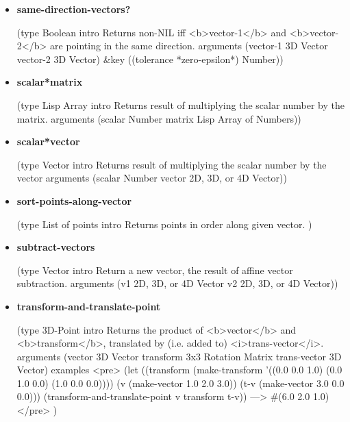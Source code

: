 \documentclass [11pt]{book}
\begin{document}
\begin{itemize}
\item {}
\label{prim:same-direction-vectors?}
\textbf{same-direction-vectors?}

(type Boolean intro
  Returns non-NIL iff <b>vector-1</b> and <b>vector-2</b> are pointing in the
same direction.
 arguments (vector-1 3D Vector vector-2 3D Vector) \&key
 ((tolerance *zero-epsilon*) Number))



\item {}
\label{prim:scalar*matrix}
\textbf{scalar*matrix}

(type Lisp Array intro
  Returns result of multiplying the scalar number by the matrix.
 arguments (scalar Number matrix Lisp Array of Numbers))



\item {}
\label{prim:scalar*vector}
\textbf{scalar*vector}

(type Vector intro
  Returns result of multiplying the scalar number by the vector
 arguments (scalar Number vector 2D, 3D, or 4D Vector))



\item {}
\label{prim:sort-points-along-vector}
\textbf{sort-points-along-vector}

(type List of points intro  Returns points in order along given vector.
)



\item {}
\label{prim:subtract-vectors}
\textbf{subtract-vectors}

(type Vector intro
  Return a new vector, the result of affine vector subtraction.
 arguments (v1 2D, 3D, or 4D Vector v2 2D, 3D, or 4D Vector))



\item {}
\label{prim:transform-and-translate-point}
\textbf{transform-and-translate-point}

(type 3D-Point intro
  Returns the product of <b>vector</b> and <b>transform</b>,
translated by (i.e. added to) <i>trans-vector</i>.
 arguments
 (vector 3D Vector transform 3x3 Rotation Matrix trans-vector
         3D Vector)
 examples 
<pre>
(let ((transform (make-transform '((0.0 0.0 1.0)
                                    (0.0 1.0 0.0)
                                    (1.0 0.0 0.0))))
       (v (make-vector 1.0 2.0 3.0))
       (t-v (make-vector 3.0 0.0 0.0)))
   (transform-and-translate-point v transform t-v))
 ---> \#(6.0 2.0 1.0)
</pre>
)




\end{itemize}
\end{document}
